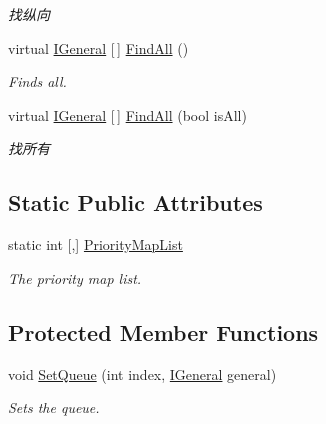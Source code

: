 \begin{DoxyCompactItemize}
\begin{DoxyCompactList}\small\item\em 找纵向 \end{DoxyCompactList}\item 
virtual \mbox{\hyperlink{interface_t_net_1_1_model_1_1_i_general}{I\+General}} \mbox{[}$\,$\mbox{]} \mbox{\hyperlink{class_t_net_1_1_model_1_1_embattle_queue_aaa5930044400403f36b6a318b130e43e}{Find\+All}} ()
\begin{DoxyCompactList}\small\item\em Finds all. \end{DoxyCompactList}\item 
virtual \mbox{\hyperlink{interface_t_net_1_1_model_1_1_i_general}{I\+General}} \mbox{[}$\,$\mbox{]} \mbox{\hyperlink{class_t_net_1_1_model_1_1_embattle_queue_a711c15dc22035e8d484988410606c1ba}{Find\+All}} (bool is\+All)
\begin{DoxyCompactList}\small\item\em 找所有 \end{DoxyCompactList}\end{DoxyCompactItemize}
\subsection*{Static Public Attributes}
\begin{DoxyCompactItemize}
\item 
static int \mbox{[},\mbox{]} \mbox{\hyperlink{class_t_net_1_1_model_1_1_embattle_queue_a520353f819d01fc5c04b8f2422abdbd7}{Priority\+Map\+List}}
\begin{DoxyCompactList}\small\item\em The priority map list. \end{DoxyCompactList}\end{DoxyCompactItemize}
\subsection*{Protected Member Functions}
\begin{DoxyCompactItemize}
\item 
void \mbox{\hyperlink{class_t_net_1_1_model_1_1_embattle_queue_a741b4aa1285df24f4d9f7590c1b89bad}{Set\+Queue}} (int index, \mbox{\hyperlink{interface_t_net_1_1_model_1_1_i_general}{I\+General}} general)
\begin{DoxyCompactList}\small\item\em Sets the queue. \end{DoxyCompactList}\end{DoxyCompactItemize}
